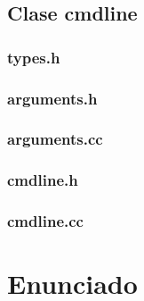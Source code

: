 \documentclass{article}
\begin{document}
  \subsection{Clase cmdline}
    \subsubsection{types.h}
      
    \subsubsection{arguments.h}
      
    \subsubsection{arguments.cc}
      
    \subsubsection{cmdline.h}
      
    \subsubsection{cmdline.cc}
      



%    

\section{Enunciado}
\end{document}
